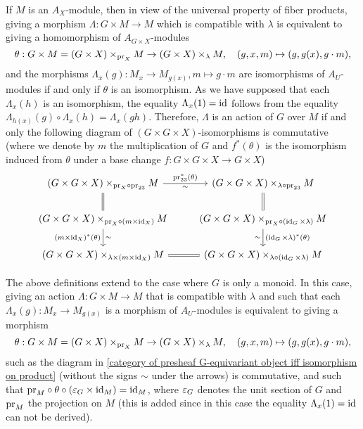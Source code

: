 \begin{remark}\label{category of presheaf G-equivariant object iff isomorphism on product}
If $M$ is an $A_X$-module, then in view of the universal property of fiber products, giving a morphism $\Lambda:G\times M\to M$ which is compatible with $\lambda$ is equivalent to giving a homomorphism of $A_{G\times X}$-modules
\[\theta:G\times M=(G\times X)\times_{\mathrm{pr}_X}M \to (G\times X)\times_\lambda M,\quad (g,x,m)\mapsto(g,g(x),g\cdot m),\]
and the morphisms $\Lambda_x(g):M_x\to M_{g(x)},m\mapsto g\cdot m$ are isomorphisms of $A_U$-modules if and only if $\theta$ is an isomorphism. As we have supposed that each $\Lambda_x(h)$ is an isomorphism, the equality $\Lambda_x(1)=\operatorname{id}$ follows from the equality $\Lambda_{h(x)}(g)\circ\Lambda_x(h)=\Lambda_{x}(gh)$. Therefore, $\Lambda$ is an action of $G$ over $M$ if and only the following diagram of $(G\times G\times X)$-isomorphisms is commutative (where we denote by $m$ the multiplication of $G$ and $f^*(\theta)$ is the isomorphism induced from $\theta$ under a base change $f:G\times G\times X\to G\times X$)
\[\begin{tikzcd}
(G\times G\times X)\times_{\pr_X\circ\pr_{23}}M\ar[r,"\pr^*_{23}(\theta)","\sim"']\ar[d,equal]&(G\times G\times X)\times_{\lambda\circ\pr_{23}}M\ar[d,equal]\\
(G\times G\times X)\times_{\pr_X\circ(m\times\id_X)}M\ar[d,swap,"(m\times\id_X)^*(\theta)","\sim"']&(G\times G\times X)\times_{\pr_X\circ(\id_G\times\lambda)}M\ar[d,"(\id_G\times\lambda)^*(\theta)","\sim"']\\
(G\times G\times X)\times_{\lambda\times(m\times\id_X)}M\ar[r,equal]&(G\times G\times X)\times_{\lambda\circ(\id_G\times\lambda)}M
\end{tikzcd}\]
\end{remark}

\begin{remark}
The above definitions extend to the case where $G$ is only a monoid. In this case, giving an action $\Lambda:G\times M\to M$ that is compatible with $\lambda$ and such that each $\Lambda_x(g):M_x\to M_{g(x)}$ is a morphism of $A_U$-modules is equivalent to giving a morphism 
\[\theta:G\times M=(G\times X)\times_{\mathrm{pr}_X}M \to (G\times X)\times_\lambda M,\quad (g,x,m)\mapsto(g,g(x),g\cdot m),\]
such as the diagram in \cref{category of presheaf G-equivariant object iff isomorphism on product} (without the signs $\sim$ under the arrows) is commutative, and such that $\mathrm{pr}_M\circ\theta\circ(\varepsilon_G\times\operatorname{id}_M)=\operatorname{id}_M$, where $\varepsilon_G$ denotes the unit section of $G$ and $\mathrm{pr}_M$ the projection on $M$ (this is added since in this case the equality $\Lambda_x(1)=\operatorname{id}$ can not be derived).
\end{remark}

